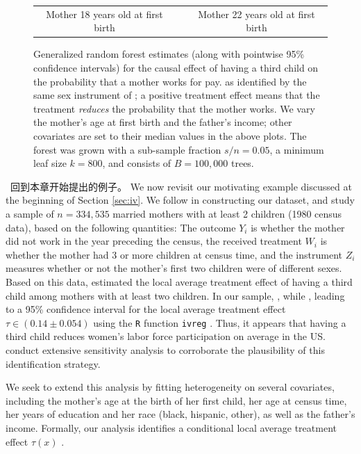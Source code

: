 \documentclass[aos]{imsart}
\theoremstyle{plain}
\theoremstyle{definition}
\theoremstyle{remark}
\begin{document}
\begin{CJK}{UTF8}{gbsn}
\begin{figure}
\begin{tabular}{ccc}
Mother 18 years old at first birth & & Mother 22 years old at first birth
\end{tabular}
\caption{Generalized random forest estimates (along with pointwise 95\% confidence intervals)
for the causal effect of having a third child on the probability
that a mother works for pay.
as identified by the same sex instrument of \citet{angrist1998children};
a positive treatment effect means that the treatment \emph{reduces} the probability that the mother works.
We vary the mother's age at first birth
and the father's income; other covariates are set to their median values in the above plots.
The forest was grown with a sub-sample fraction $s/n = 0.05$, a minimum leaf size $k = 800$, and
consists of $B = 100,000$ trees.}
\label{fig:familysize}
\vspace{-1.5\baselineskip}
\end{figure}

\, 回到本章开始提出的例子。
We now revisit our motivating example discussed at the beginning of Section \ref{sec:iv}.
We follow \citet{angrist1998children} in constructing our dataset, and
study a sample of $n = 334,535$ married mothers with at least 2 children (1980 census data),
based on the following quantities: The outcome $Y_i$ is whether the mother did not work in the
year preceding the census, the received treatment $W_i$ is whether the mother had 3 or more
children at census time, and the instrument $Z_i$ measures whether or not
the mother's first two children were of different sexes.
Based on this data, \citet{angrist1998children} estimated the local average treatment effect
of having a third child among mothers with at least two children.
In our sample, , while
, leading to a 95\% confidence interval for the
local average treatment effect $\tau \in (0.14 \pm 0.054)$ using the \texttt{R} function
\texttt{ivreg} \citep{kleiber2008applied}. Thus, it appears that having a third child reduces
women's labor force participation on average in the US.
\citet{angrist1998children} conduct extensive sensitivity analysis to corroborate the
plausibility of this identification strategy.

We seek to extend this analysis by fitting heterogeneity
on several covariates, including the mother's age at the birth of her first child, her age at census time,
her years of education and her race (black, hispanic, other), as well as the father's income. Formally, our analysis identifies
a conditional local average treatment effect $\tau(x)$ \citep{abadie2003semiparametric,imbens1994identification}.


\end{CJK}
\end{document}
